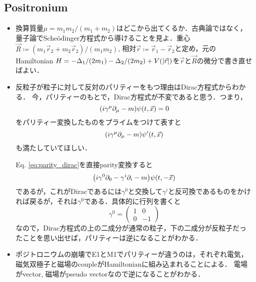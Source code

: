 \subsection{Positronium}
\begin{itemize}
		\item 換算質量$\mu = m_1m_2/(m_1 + m_2) $はどこから出てくるか．古典論ではなく，量子論でSche\"{o}dinger方程式から導けることを見よ．重心$\vec{R}\coloneqq (m_1\vec{r}_2+m_2\vec{r}_2)/(m_1m_2) $, 相対$\vec{r}\coloneqq \vec{r}_1-\vec{r}_2$と定め，元のHamiltonian $H = -\Delta_1/(2m_1)-\Delta_2/(2m_2)+V(\abs{\vec{r}}) $を$\vec{r} $と$\vec{R} $の微分で書き直せばよい．
		\item 反粒子が粒子に対して反対のパリティーをもつ理由はDirac方程式からわかる．
				今，パリティーのもとで，Dirac方程式が不変であると思う．つまり，
				\begin{equation}
						\qty(i\gamma^{\mu}\partial_{\mu} - m)\psi(t, \vec{x}) = 0\label{eq:parity_dirac}
				\end{equation}
				をパリティー変換したものをプライムをつけて表すと
				\begin{equation}
						\qty(i\gamma^{\mu}\partial_{\mu}-m)\psi'(t, \vec{x})
				\end{equation}
				も満たしていてほしい．

				Eq. \eqref{eq:parity_dirac}を直接parity変換すると
				\begin{equation}
						\qty(i\gamma^{0}\partial_0 - \gamma^{i}\partial_{i}-m)\psi(t, -\vec{x})
				\end{equation}
				であるが，これがDiracであるには$\gamma^0 $と交換して$\gamma^i $と反可換であるものをかければ戻るが，それは$\gamma^0 $である．具体的に行列を書くと
				\begin{equation}
						\gamma^{0} = \begin{pmatrix}
								1 & 0\\
								0 & -1
						\end{pmatrix}
				\end{equation}
				なので，Dirac方程式の上の二成分が通常の粒子，下の二成分が反粒子だったことを思い出せば，パリティーは逆になることがわかる．
		\item ポジトロニウムの崩壊でE1とM1でパリティーが違うのは，それぞれ電気，磁気双極子と磁場のcoupleがHamiltonianに組み込まれることによる．
				電場がvector, 磁場がpseudo vectorなので逆になることがわかる．
\end{itemize}
